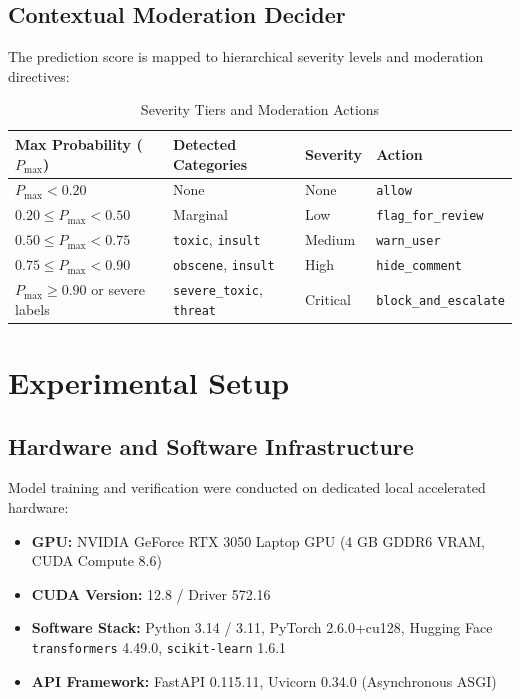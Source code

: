 \documentclass[12pt,a4paper]{article}
\begin{document}
\subsection{Contextual Moderation Decider}
The prediction score is mapped to hierarchical severity levels and moderation directives:
\begin{table}[H]
    \centering
    \caption{Severity Tiers and Moderation Actions}
    \label{tab:moderation_rules}
    \begin{tabular}{llll}
        \toprule
        \textbf{Max Probability ($P_{\max}$)} & \textbf{Detected Categories} & \textbf{Severity} & \textbf{Action} \\
        \midrule
        $P_{\max} < 0.20$ & None & None & \texttt{allow} \\
        $0.20 \leq P_{\max} < 0.50$ & Marginal & Low & \texttt{flag\_for\_review} \\
        $0.50 \leq P_{\max} < 0.75$ & \texttt{toxic}, \texttt{insult} & Medium & \texttt{warn\_user} \\
        $0.75 \leq P_{\max} < 0.90$ & \texttt{obscene}, \texttt{insult} & High & \texttt{hide\_comment} \\
        $P_{\max} \geq 0.90$ or severe labels & \texttt{severe\_toxic}, \texttt{threat} & Critical & \texttt{block\_and\_escalate} \\
        \bottomrule
    \end{tabular}
\end{table}

\section{Experimental Setup}

\subsection{Hardware and Software Infrastructure}
Model training and verification were conducted on dedicated local accelerated hardware:
\begin{itemize}
    \item \textbf{GPU:} NVIDIA GeForce RTX 3050 Laptop GPU (4 GB GDDR6 VRAM, CUDA Compute 8.6)
    \item \textbf{CUDA Version:} 12.8 / Driver 572.16
    \item \textbf{Software Stack:} Python 3.14 / 3.11, PyTorch 2.6.0+cu128, Hugging Face \texttt{transformers} 4.49.0, \texttt{scikit-learn} 1.6.1
    \item \textbf{API Framework:} FastAPI 0.115.11, Uvicorn 0.34.0 (Asynchronous ASGI)
\end{itemize}
\end{document}
